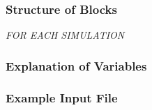 \vspace{5mm}
\subsubsection{Structure of Blocks}

\vspace{5mm}
\noindent \textit{FOR EACH SIMULATION}




\vspace{5mm}
\subsubsection{Explanation of Variables}
\begin{description}

\end{description}

\vspace{5mm}
\subsubsection{Example Input File}


